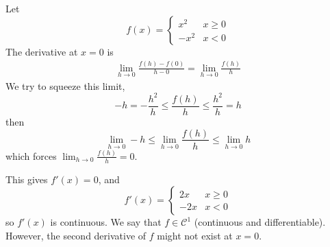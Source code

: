 \begin{example}
    Let
    \[f(x) = \begin{cases}
            x^2  & x\geq 0 \\
            -x^2 & x < 0
        \end{cases}\]
    The derivative at $x = 0$ is
    \begin{align*}
        \lim_{h\to 0} \frac{f(h) - f(0)}{h - 0} = \lim_{h\to 0}\frac{f(h)}{h}
    \end{align*}
    We try to squeeze this limit,
    \[-h = -\frac{h^2}{h} \leq \frac{f(h)}{h} \leq \frac{h^2}{h} = h\]
    then
    \[\lim_{h\to 0} -h \leq \lim_{h\to 0}\frac{f(h)}{h}\leq \lim_{h\to 0}h\]
    which forces $\lim_{h\to 0}\frac{f(h)}{h} = 0$.

    This gives $f'(x) = 0$, and
    \[f'(x) = \begin{cases}
            2x  & x\geq 0 \\
            -2x & x< 0
        \end{cases}\]
    so $f'(x)$ is continuous. We say that $f\in \mathcal{C}^1$ (continuous and differentiable). However, the second derivative of $f$ might not exist at $x = 0$.
\end{example}